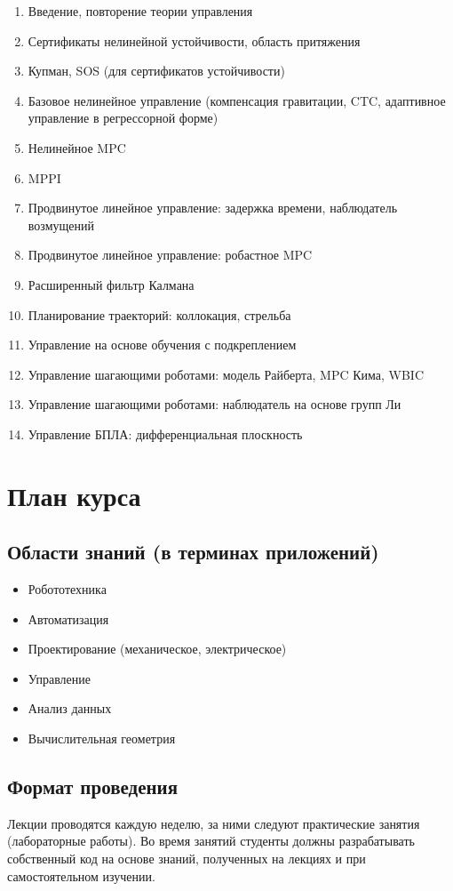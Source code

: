 \documentclass[11pt,a4paper]{article}
\begin{document}
\begin{enumerate}
	\item Введение, повторение теории управления
	\item Сертификаты нелинейной устойчивости, область притяжения
	\item Купман, SOS (для сертификатов устойчивости)
	\item Базовое нелинейное управление (компенсация гравитации, CTC, адаптивное управление в регрессорной форме)
	\item Нелинейное MPC
	\item MPPI
	\item Продвинутое линейное управление: задержка времени, наблюдатель возмущений
	\item Продвинутое линейное управление: робастное MPC
	\item Расширенный фильтр Калмана
	\item Планирование траекторий: коллокация, стрельба
	\item Управление на основе обучения с подкреплением
	\item Управление шагающими роботами: модель Райберта, MPC Кима, WBIC
	\item Управление шагающими роботами: наблюдатель на основе групп Ли
	\item Управление БПЛА: дифференциальная плоскность
\end{enumerate}

\section{План курса}

\subsection{Области знаний (в терминах приложений)}

\begin{itemize}
	\item Робототехника
	\item Автоматизация
	\item Проектирование (механическое, электрическое)
	\item Управление
	\item Анализ данных
	\item Вычислительная геометрия
\end{itemize}

\subsection{Формат проведения}
Лекции проводятся каждую неделю, за ними следуют практические занятия (лабораторные работы). Во время занятий студенты должны разрабатывать собственный код на основе знаний, полученных на лекциях и при самостоятельном изучении.
\end{document}
